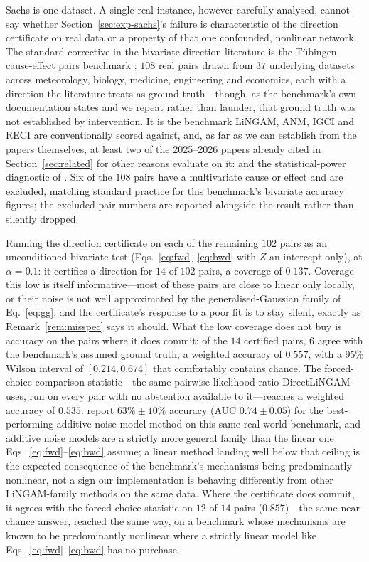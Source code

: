 \documentclass[pdflatex,sn-apa]{sn-jnl}
\theoremstyle{thmstyleone}%
\theoremstyle{thmstyletwo}%
\theoremstyle{thmstylethree}%
\begin{document}
Sachs is one dataset. A single real instance, however carefully analysed,
cannot say whether Section~\ref{sec:exp-sachs}'s failure is characteristic of
the direction certificate on real data or a property of that one confounded,
nonlinear network. The standard corrective in the bivariate-direction
literature is the Tübingen cause-effect pairs benchmark
\citep{mooij2016distinguishing}: $108$ real pairs drawn from $37$ underlying
datasets across meteorology, biology, medicine, engineering and economics,
each with a direction the literature treats as ground truth---though, as the
benchmark's own documentation states and we repeat rather than launder, that
ground truth was not established by intervention. It is the benchmark
LiNGAM, ANM, IGCI and RECI are conventionally scored against, and, as far as
we can establish from the papers themselves, at least two of the 2025--2026
papers already cited in Section~\ref{sec:related} for other reasons evaluate
on it: \citet{ding2025gaussdetect} and the statistical-power diagnostic of
\citet{prakash2026power}. Six of the $108$ pairs have a multivariate cause or
effect and are excluded, matching standard practice for this benchmark's
bivariate accuracy figures; the excluded pair numbers are reported alongside
the result rather than silently dropped.

Running the direction certificate on each of the remaining $102$ pairs as an
unconditioned bivariate test (Eqs.~\eqref{eq:fwd}--\eqref{eq:bwd} with $Z$ an
intercept only), at $\alpha=0.1$: it certifies a direction for $14$ of $102$
pairs, a coverage of $0.137$. Coverage this low is itself informative---most
of these pairs are close to linear only locally, or their noise is not well
approximated by the generalised-Gaussian family of Eq.~\eqref{eq:gg}, and the
certificate's response to a poor fit is to stay silent, exactly as
Remark~\ref{rem:misspec} says it should. What the low coverage does not buy is
accuracy on the pairs where it does commit: of the $14$ certified pairs, $6$
agree with the benchmark's assumed ground truth, a weighted accuracy of
$0.557$, with a $95\%$ Wilson interval of $[0.214, 0.674]$ that comfortably
contains chance. The forced-choice comparison statistic---the same pairwise
likelihood ratio DirectLiNGAM uses, run on every pair with no abstention
available to it---reaches a weighted accuracy of $0.535$. \citet{mooij2016distinguishing}
report $63\% \pm 10\%$ accuracy (AUC $0.74 \pm 0.05$) for the best-performing
additive-noise-model method on this same real-world benchmark, and additive
noise models are a strictly more general family than the linear one
Eqs.~\eqref{eq:fwd}--\eqref{eq:bwd} assume; a linear method landing well below
that ceiling is the expected consequence of the benchmark's mechanisms being
predominantly nonlinear, not a sign our implementation is behaving
differently from other LiNGAM-family methods on the same data. Where
the certificate does commit, it agrees with the forced-choice statistic on
$12$ of $14$ pairs ($0.857$)---the same near-chance answer, reached the same
way, on a benchmark whose mechanisms are known to be predominantly nonlinear
where a strictly linear model like Eqs.~\eqref{eq:fwd}--\eqref{eq:bwd} has no
purchase.
\end{document}
